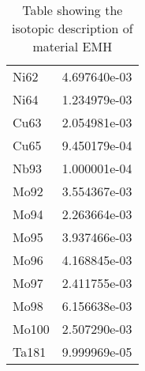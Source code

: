 \begin{centering}
\begin{table}[ht!]
\begin{tabular}{l | c}
Ni62 & 4.697640e-03\\
Ni64 & 1.234979e-03\\
Cu63 & 2.054981e-03\\
Cu65 & 9.450179e-04\\
Nb93 & 1.000001e-04\\
Mo92 & 3.554367e-03\\
Mo94 & 2.263664e-03\\
Mo95 & 3.937466e-03\\
Mo96 & 4.168845e-03\\
Mo97 & 2.411755e-03\\
Mo98 & 6.156638e-03\\
Mo100 & 2.507290e-03\\
Ta181 & 9.999969e-05
\end{tabular}
\caption{Table showing the isotopic description of material EMH}
\label{table:material_EMH}
\end{table}\clearpage


\end{centering}
